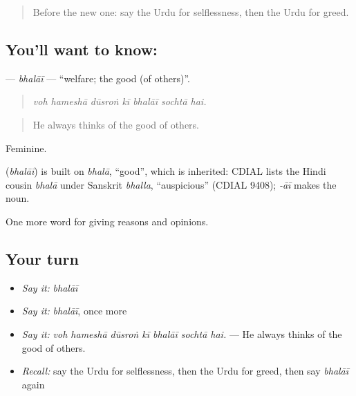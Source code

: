 \label{lesson:UR-C346-bhalai}



\begin{quote}
Before the new one: say the Urdu for selflessness, then the Urdu for greed.
\end{quote}

\subsection*{You'll want to know: }
\textbf{} — \emph{bhalāī} — \textquotedblleft{}welfare; the good (of others)\textquotedblright{}.

\begin{quote}
      
\end{quote}

\begin{quote}
\emph{voh hameshā dūsroṅ kī bhalāī sochtā hai.}
\end{quote}

\begin{quote}
He always thinks of the good of others.
\end{quote}

Feminine.

\begin{cousinweb}
\textbf{} (\emph{bhalāī}) is built on \emph{bhalā}, \textquotedblleft{}good\textquotedblright{}, which is inherited: CDIAL lists the Hindi cousin \emph{bhalā} under Sanskrit \emph{bhalla}, \textquotedblleft{}auspicious\textquotedblright{} (CDIAL 9408); \emph{-āī} makes the noun.
\end{cousinweb}

\begin{grammarlens}[title={What you've built}]
One more word for giving reasons and opinions.
\end{grammarlens}

\subsection*{Your turn}
\begin{itemize}
\raggedright
  \item \emph{Say it:} \emph{bhalāī}
  \item \emph{Say it:} \emph{bhalāī}, once more
  \item \emph{Say it:} \emph{voh hameshā dūsroṅ kī bhalāī sochtā hai.} — He always thinks of the good of others.
  \item \emph{Recall:} say the Urdu for selflessness, then the Urdu for greed, then say \emph{bhalāī} again
\end{itemize}

